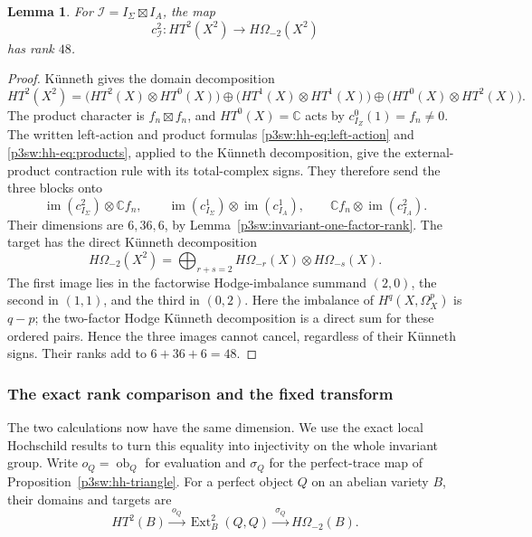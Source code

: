 \documentclass[11pt]{article}
\newtheorem{lemma}[theorem]{Lemma}
\numberwithin{equation}{section}
\begin{document}
\begin{lemma}\label{p3sw:invariant-product-rank}
For \(\mathcal I=I_\Sigma\boxtimes I_A\), the map
\[
 c_{\mathcal I}^2:HT^2(X^2)\longrightarrow H\Omega_{-2}(X^2)
\]
has rank \(48\).
\end{lemma}

\begin{proof}
K\"unneth gives the domain decomposition
\[
 HT^2(X^2)=
 \bigl(HT^2(X)\otimes HT^0(X)\bigr)
 \oplus\bigl(HT^1(X)\otimes HT^1(X)\bigr)
 \oplus\bigl(HT^0(X)\otimes HT^2(X)\bigr).
\]
The product character is \(f_n\boxtimes f_n\), and \(HT^0(X)=\mathbb C\)
acts by \(c_{I_Z}^0(1)=f_n\ne0\).  The written left-action and product
formulas \eqref{p3sw:hh-eq:left-action} and
\eqref{p3sw:hh-eq:products}, applied to the K\"unneth decomposition,
give the external-product contraction rule with its total-complex
signs.  They therefore send the three blocks onto
\[
 \operatorname{im}(c_{I_\Sigma}^2)\otimes\mathbb C f_n,\qquad
 \operatorname{im}(c_{I_\Sigma}^1)\otimes
       \operatorname{im}(c_{I_A}^1),\qquad
 \mathbb C f_n\otimes\operatorname{im}(c_{I_A}^2).
\]
Their dimensions are \(6,36,6\), by
Lemma~\ref{p3sw:invariant-one-factor-rank}.  The target has the direct
K\"unneth decomposition
\[
 H\Omega_{-2}(X^2)
 =\bigoplus_{r+s=2}H\Omega_{-r}(X)\otimes H\Omega_{-s}(X).
\]
The first image lies in the
factorwise Hodge-imbalance summand \((2,0)\), the second in \((1,1)\),
and the third in \((0,2)\).  Here the imbalance of
\(H^q(X,\Omega_X^p)\) is \(q-p\); the two-factor Hodge K\"unneth
decomposition is a direct sum for these ordered pairs.  Hence the
three images cannot cancel, regardless of their K\"unneth signs.
Their ranks add to \(6+36+6=48\).
\end{proof}

\subsubsection{The exact rank comparison and the fixed transform}

The two calculations now have the same dimension.  We use the exact
local Hochschild results to turn this equality into injectivity on the
whole invariant group.  Write \(o_Q=\operatorname{ob}_Q\) for evaluation
and \(\sigma_Q\) for the perfect-trace map of
Proposition~\ref{p3sw:hh-triangle}.  For a perfect object \(Q\) on an
abelian variety \(B\), their domains and targets are
\[
 HT^2(B)\xrightarrow{\ o_Q\ }\operatorname{Ext}^2_B(Q,Q)
        \xrightarrow{\ \sigma_Q\ }H\Omega_{-2}(B).
\]
\end{document}
